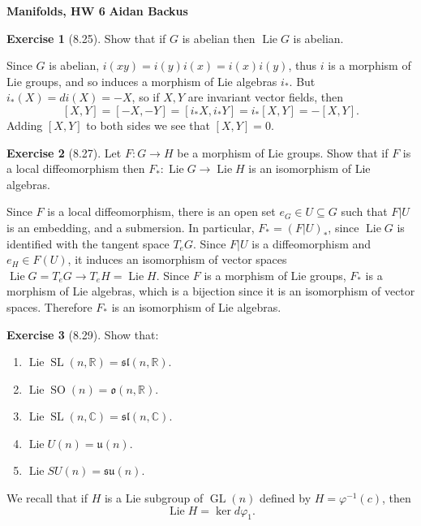 \documentclass[10pt]{article}
\newcommand{\RR}{\mathbb{R}}
\newcommand{\CC}{\mathbb{C}}
\DeclareMathOperator{\Lie}{Lie}
\newcommand{\GL}{\operatorname{GL}}
\newcommand{\SL}{\operatorname{SL}}
\newcommand{\SO}{\operatorname{SO}}
\theoremstyle{definition}
\newtheorem{exer}{Exercise}
\begin{document}
\noindent
\large\textbf{Manifolds, HW 6} \hfill \textbf{Aidan Backus} \\


\begin{exer}[8.25]
Show that if $G$ is abelian then $\Lie G$ is abelian.
\end{exer}

Since $G$ is abelian, $i(xy) = i(y)i(x) = i(x)i(y)$, thus $i$ is a morphism of Lie groups, and so induces a morphism of Lie algebras $i_*$.
But $i_*(X) = di(X) = -X$, so if $X, Y$ are invariant vector fields, then
$$[X, Y] = [-X, -Y] = [i_*X, i_*Y] = i_*[X, Y] = -[X, Y].$$
Adding $[X, Y]$ to both sides we see that $[X, Y] = 0$.

\begin{exer}[8.27]
Let $F: G \to H$ be a morphism of Lie groups.
Show that if $F$ is a local diffeomorphism then $F_*: \Lie G \to \Lie H$ is an isomorphism of Lie algebras.
\end{exer}

Since $F$ is a local diffeomorphism, there is an open set $e_G \in U \subseteq G$ such that $F|U$ is an embedding, and a submersion.
In particular, $F_* = (F|U)_*$, since $\Lie G$ is identified with the tangent space $T_eG$.
Since $F|U$ is a diffeomorphism and $e_H \in F(U)$, it induces an isomorphism of vector spaces $\Lie G = T_eG \to T_eH = \Lie H$.
Since $F$ is a morphism of Lie groups, $F_*$ is a morphism of Lie algebras, which is a bijection since it is an isomorphism of vector spaces.
Therefore $F_*$ is an isomorphism of Lie algebras.

\begin{exer}[8.29]
Show that:
\begin{enumerate}
\item $\Lie \SL(n, \RR) = \mathfrak{sl}(n, \RR)$.
\item $\Lie \SO(n) = \mathfrak o(n, \RR)$.
\item $\Lie \SL(n, \CC) = \mathfrak{sl}(n, \CC)$.
\item $\Lie U(n) = \mathfrak u(n)$.
\item $\Lie SU(n) = \mathfrak{su}(n)$.
\end{enumerate}
\end{exer}

We recall that if $H$ is a Lie subgroup of $\GL(n)$ defined by $H = \varphi^{-1}(c)$, then
$$\Lie H = \ker d\varphi_1.$$
\end{document}
